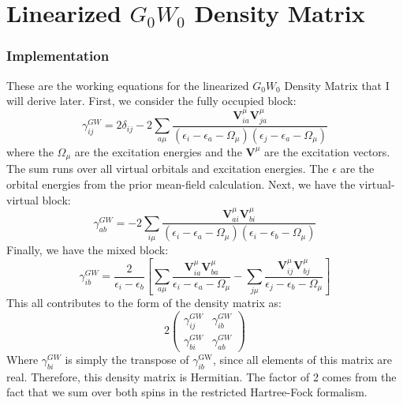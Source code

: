 \documentclass[12pt]{caltech_thesis}
\begin{document}
\chapter{Linearized $G_0W_0$ Density Matrix}
\subsection{Implementation}
These are the working equations for the linearized $G_0W_0$ Density Matrix that I will derive later. \autocite{bruneval_assessment_2019} First, we consider the fully occupied block:
\begin{equation}
\gamma_{i j}^{G W}=2\delta_{i j}-2\sum_{a \mu} \frac{\textbf{V}_{i a}^\mu \textbf{V}_{ja}^\mu}{\left(\epsilon_{i}-\epsilon_{a}-\Omega_{\mu}\right)\left(\epsilon_{j}-\epsilon_{a}-\Omega_{\mu}\right)}
\end{equation}
where the $\Omega_{\mu}$ are the excitation energies and the $\textbf{V}^{\mu}$ are the excitation vectors. The sum runs over all virtual orbitals and excitation energies. The $\epsilon$ are the orbital energies from the prior mean-field calculation. Next, we have the virtual-virtual block:
\begin{equation}
\gamma_{a b}^{G W}=-2\sum_{i \mu } \frac{\textbf{V}_{a i}^{\mu} \textbf{V}_{b i}^{\mu}}{\left(\epsilon_{i}-\epsilon_{a}-\Omega_{\mu}\right)\left(\epsilon_{i}-\epsilon_{b}-\Omega_{\mu}\right)}
\end{equation}
Finally, we have the mixed block:
\begin{equation}
    \gamma_{i b}^{G W}=\frac{2}{\epsilon_{i}-\epsilon_{b}}\left[ \sum_{a \mu} \frac{\textbf{V}_{i a}^{\mu} \textbf{V}_{b a}^{\mu}}{\epsilon_{i}-\epsilon_{a}-\Omega_{\mu}} - \sum_{j \mu} \frac{\textbf{V}_{i j}^{\mu} \textbf{V}_{bj}^{\mu}}{\epsilon_{j}-\epsilon_{b}-\Omega_{\mu}} \right]
\end{equation}
This all contributes to the form of the density matrix as:
\begin{equation}
    2\begin{pmatrix}
        \gamma _{i j}^{G W} & \gamma _{i b}^{G W} \\
        \gamma _{bi}^{G W } & \gamma _{a b}^{G W}
    \end{pmatrix}
\end{equation}
Where $\gamma _{bi}^{G W }$ is simply the transpose of $\gamma _{ib}^{\text{GW}}$, since all elements of this matrix are real. Therefore, this density matrix is Hermitian. The factor of 2 comes from the fact that we sum over both spins in the restricted Hartree-Fock formalism.
\newpage
\end{document}
